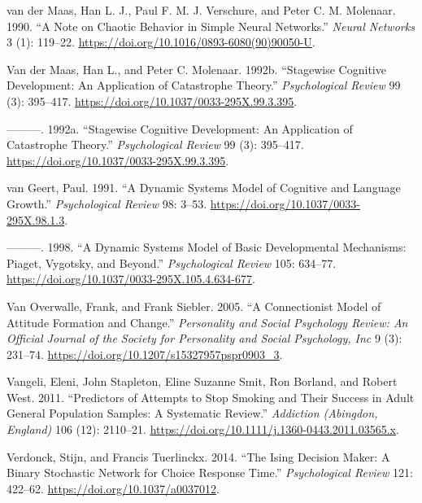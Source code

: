 \documentclass[
  a4paper,
  DIV=11,
  numbers=noendperiod,
  oneside]{scrreprt}
\newlength{\cslhangindent}
\newlength{\cslentryspacingunit} %
\newenvironment{CSLReferences}[2] %
 {%
  \setlength{\parindent}{0pt}
  \ifodd #1
  \let\oldpar\par
  \def\par{\hangindent=\cslhangindent\oldpar}
  \fi
  \setlength{\parskip}{#2\cslentryspacingunit}
 }%
 {}
\begin{document}
\begin{CSLReferences}{1}{0}
\leavevmode{}%
van der Maas, Han L. J., Paul F. M. J. Verschure, and Peter C. M.
Molenaar. 1990. {``A Note on Chaotic Behavior in Simple Neural
Networks.''} \emph{Neural Networks} 3 (1): 119--22.
\url{https://doi.org/10.1016/0893-6080(90)90050-U}.

\leavevmode{}%
Van der Maas, Han L., and Peter C. Molenaar. 1992b. {``Stagewise
Cognitive Development: {An} Application of Catastrophe Theory.''}
\emph{Psychological Review} 99 (3): 395--417.
\url{https://doi.org/10.1037/0033-295X.99.3.395}.

\leavevmode{}%
---------. 1992a. {``Stagewise Cognitive Development: An Application of
Catastrophe Theory.''} \emph{Psychological Review} 99 (3): 395--417.
\url{https://doi.org/10.1037/0033-295X.99.3.395}.

\leavevmode{}%
van Geert, Paul. 1991. {``A Dynamic Systems Model of Cognitive and
Language Growth.''} \emph{Psychological Review} 98: 3--53.
\url{https://doi.org/10.1037/0033-295X.98.1.3}.

\leavevmode{}%
---------. 1998. {``A Dynamic Systems Model of Basic Developmental
Mechanisms: {Piaget}, {Vygotsky}, and Beyond.''} \emph{Psychological
Review} 105: 634--77.
\url{https://doi.org/10.1037/0033-295X.105.4.634-677}.

\leavevmode{}%
Van Overwalle, Frank, and Frank Siebler. 2005. {``A Connectionist Model
of Attitude Formation and Change.''} \emph{Personality and Social
Psychology Review: An Official Journal of the Society for Personality
and Social Psychology, Inc} 9 (3): 231--74.
\url{https://doi.org/10.1207/s15327957pspr0903_3}.

\leavevmode{}%
Vangeli, Eleni, John Stapleton, Eline Suzanne Smit, Ron Borland, and
Robert West. 2011. {``Predictors of Attempts to Stop Smoking and Their
Success in Adult General Population Samples: A Systematic Review.''}
\emph{Addiction (Abingdon, England)} 106 (12): 2110--21.
\url{https://doi.org/10.1111/j.1360-0443.2011.03565.x}.

\leavevmode{}%
Verdonck, Stijn, and Francis Tuerlinckx. 2014. {``The {Ising Decision
Maker}: {A} Binary Stochastic Network for Choice Response Time.''}
\emph{Psychological Review} 121: 422--62.
\url{https://doi.org/10.1037/a0037012}.


\end{CSLReferences}
\end{document}

